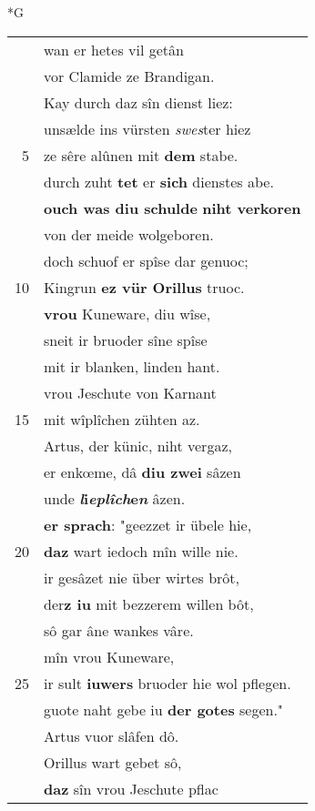 \documentclass[8pt,a4paper,notitlepage]{article}
\begin{document}
\begin{table}[ht]
\begin{minipage}[t]{0.5\linewidth}
\small
\begin{center}*G
\end{center}
\begin{tabular}{rl}
 & wan er hetes vil getân\\ 
 & vor Clamide ze Brandigan.\\ 
 & Kay durch daz sîn dienst liez:\\ 
 & unsælde ins vürsten \textit{swes}ter hiez\\ 
5 & ze sêre alûnen mit \textbf{dem} stabe.\\ 
 & durch zuht \textbf{tet} er \textbf{sich} dienstes abe.\\ 
 & \textbf{ouch was diu schulde} \textbf{niht verkoren}\\ 
 & von der meide wolgeboren.\\ 
 & doch schuof er spîse dar genuoc;\\ 
10 & Kingrun \textbf{ez vür Orillus} truoc.\\ 
 & \textbf{vrou} Kuneware, diu wîse,\\ 
 & sneit ir bruoder sîne spîse\\ 
 & mit ir blanken, linden hant.\\ 
 & vrou Jeschute von Karnant\\ 
15 & mit wîplîchen zühten az.\\ 
 & Artus, der künic, niht vergaz,\\ 
 & er enkœme, dâ \textbf{diu zwei} sâzen\\ 
 & unde \textbf{\textit{l}i\textit{eplîch}e\textit{n}} âzen.\\ 
 & \textbf{er sprach}: "geezzet ir übele hie,\\ 
20 & \textbf{daz} wart iedoch mîn wille nie.\\ 
 & ir gesâzet nie über wirtes brôt,\\ 
 & der\textbf{z iu} mit bezzerem willen bôt,\\ 
 & sô gar âne wankes vâre.\\ 
 & mîn vrou Kuneware,\\ 
25 & ir sult \textbf{iuwers} bruoder hie wol pflegen.\\ 
 & guote naht gebe iu \textbf{der gotes} segen."\\ 
 & Artus vuor slâfen dô.\\ 
 & Orillus wart gebet sô,\\ 
 & \textbf{daz} sîn vrou Jeschute pflac\\ 

\end{tabular}
\end{minipage}
\end{table}
\end{document}
